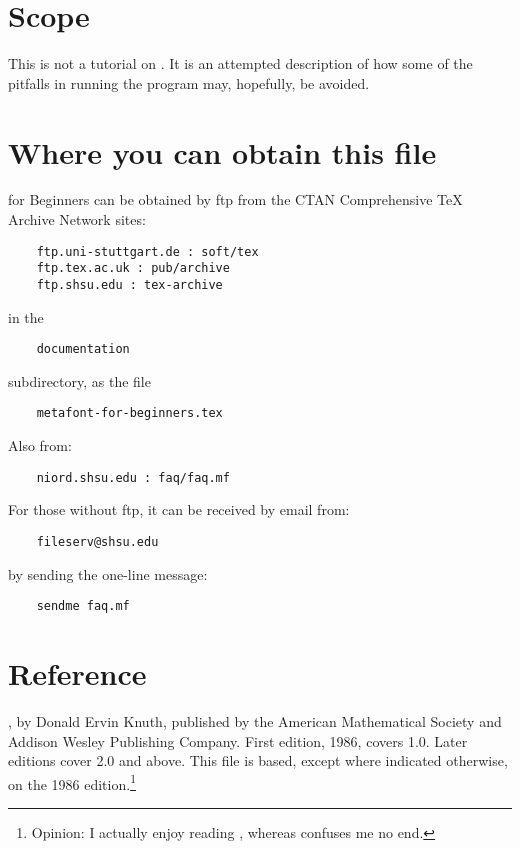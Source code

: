 \section*{Scope}%

This is not a tutorial on \MF{}.  It is an attempted description of
how some of the pitfalls in running the program may, hopefully, be
avoided.


\section*{Where you can obtain this file}%

\MF{} for Beginners can be obtained by ftp from the CTAN
{Comprehensive TeX Archive Network} sites:
\begin{verbatim}
    ftp.uni-stuttgart.de : soft/tex
    ftp.tex.ac.uk : pub/archive
    ftp.shsu.edu : tex-archive
\end{verbatim}
in the
\begin{verbatim}
    documentation
\end{verbatim}
subdirectory, as the file
\begin{verbatim}
    metafont-for-beginners.tex
\end{verbatim}
Also from:
\begin{verbatim}
    niord.shsu.edu : faq/faq.mf
\end{verbatim}

For those without ftp, it can be received by email from:
\begin{verbatim}
    fileserv@shsu.edu
\end{verbatim}
by sending the one-line message:
\begin{verbatim}
    sendme faq.mf
\end{verbatim}


\section*{Reference}%

\MFbook{}, by Donald Ervin {\sc Knuth}, published by the
American Mathematical Society and Addison Wesley Publishing Company.
First edition, 1986, covers \MF{} 1.0.
Later editions cover \MF{} 2.0 and above.
This file is based, except where indicated otherwise,
on the 1986 edition.\footnote
{Opinion:  I actually enjoy reading \MFbook{},
whereas \TeXbook{} confuses me no end.}


